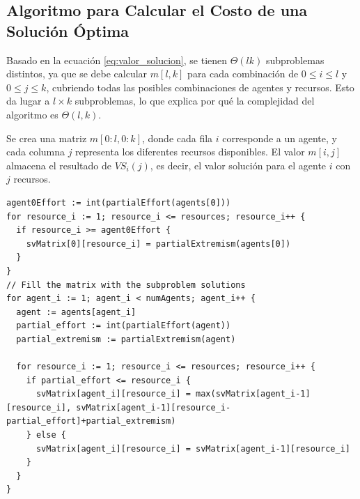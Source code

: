 \documentclass[letterpaper,10pt]{article}
\begin{document}
\subsection{Algoritmo para Calcular el Costo de una Solución Óptima}
\label{subsec:algoritmo_costo_solucion_optima}
Basado en la ecuación \eqref{eq:valor_solucion}, se tienen \(\Theta(lk)\) subproblemas distintos, ya que se debe calcular \(m[l, k]\) para cada combinación de \(0 \leq i \leq l\) y \(0 \leq j \leq k\), cubriendo todas las posibles combinaciones de agentes y recursos. Esto da lugar a \(l \times k\) subproblemas, lo que explica por qué la complejidad del algoritmo es \(\Theta(l, k)\). 

Se crea una matriz \(m[0:l, 0:k]\), donde cada fila \(i\) corresponde a un agente, y cada columna \(j\) representa los diferentes recursos disponibles. El valor \(m[i,j]\) almacena el resultado de \(VS_i(j)\), es decir, el valor solución para el agente \(i\) con \(j\) recursos.

\begin{lstlisting}[caption={matrix $m$ $\rightarrow$Extracción del algoritmo ModexPD}, label={lst:modexpd_extraccion}]
agent0Effort := int(partialEffort(agents[0]))
for resource_i := 1; resource_i <= resources; resource_i++ {
  if resource_i >= agent0Effort {
    svMatrix[0][resource_i] = partialExtremism(agents[0])
  }
}
// Fill the matrix with the subproblem solutions
for agent_i := 1; agent_i < numAgents; agent_i++ {
  agent := agents[agent_i]
  partial_effort := int(partialEffort(agent))
  partial_extremism := partialExtremism(agent)

  for resource_i := 1; resource_i <= resources; resource_i++ {
    if partial_effort <= resource_i {
      svMatrix[agent_i][resource_i] = max(svMatrix[agent_i-1][resource_i], svMatrix[agent_i-1][resource_i-partial_effort]+partial_extremism)
    } else {
      svMatrix[agent_i][resource_i] = svMatrix[agent_i-1][resource_i]
    }
  }
}
\end{lstlisting}
\end{document}
